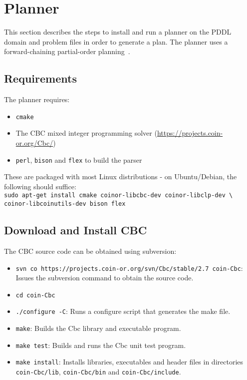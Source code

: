 \section{Planner}\label{section:planner}
This section describes the steps to install and run a planner on the PDDL domain and problem files in order to generate a plan. The planner uses a forward-chaining partial-order planning~\cite{Coles.ICAPS.2010}.

\subsection{Requirements}
The planner requires:
\begin{itemize}
\item \texttt{cmake}
\item The CBC mixed integer programming solver (\url{https://projects.coin-or.org/Cbc/})
\item \texttt{perl}, \texttt{bison} and \texttt{flex} to build the parser
\end{itemize}

These are packaged with most Linux distributions - on Ubuntu/Debian, the following should suffice:\\

\texttt{sudo apt-get install cmake coinor-libcbc-dev coinor-libclp-dev \textbackslash \\coinor-libcoinutils-dev bison flex}

\subsection{Download and Install CBC}
The CBC source code can be obtained using subversion:
\begin{itemize}
\item \texttt{svn co https://projects.coin-or.org/svn/Cbc/stable/2.7 coin-Cbc}: Issues the subversion command to obtain the source code.
\item \texttt{cd coin-Cbc}
\item \texttt{./configure -C}: Runs a configure script that generates the make file.
\item \texttt{make}: Builds the Cbc library and executable program.
\item \texttt{make test}: Builds and runs the Cbc unit test program.
\item \texttt{make install}: Installs libraries, executables and header files in directories \texttt{coin-Cbc/lib}, \texttt{coin-Cbc/bin} and \texttt{coin-Cbc/include}.
\end{itemize}

